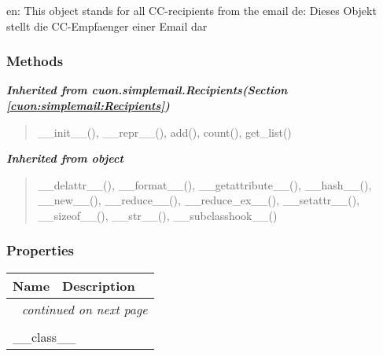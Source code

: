 en: This object stands for all CC-recipients from the email de: Dieses 
Objekt stellt die CC-Empfaenger einer Email dar



  \subsubsection{Methods}


\large{\textbf{\textit{Inherited from cuon.simplemail.Recipients\textit{(Section \ref{cuon:simplemail:Recipients})}}}}

\begin{quote}
\_\_init\_\_(), \_\_repr\_\_(), add(), count(), get\_list()
\end{quote}

\large{\textbf{\textit{Inherited from object}}}

\begin{quote}
\_\_delattr\_\_(), \_\_format\_\_(), \_\_getattribute\_\_(), \_\_hash\_\_(), \_\_new\_\_(), \_\_reduce\_\_(), \_\_reduce\_ex\_\_(), \_\_setattr\_\_(), \_\_sizeof\_\_(), \_\_str\_\_(), \_\_subclasshook\_\_()
\end{quote}


  \subsubsection{Properties}

    \vspace{-1cm}
\hspace{\varindent}\begin{longtable}{|p{\varnamewidth}|p{\vardescrwidth}|l}
\cline{1-2}
\cline{1-2} \centering \textbf{Name} & \centering \textbf{Description}& \\
\cline{1-2}
\endhead\cline{1-2}\multicolumn{3}{r}{\small\textit{continued on next page}}\\\endfoot\cline{1-2}
\endlastfoot\multicolumn{2}{|l|}{\textit{Inherited from object}}\\
\multicolumn{2}{|p{\varwidth}|}{\raggedright \_\_class\_\_}\\
\cline{1-2}
\end{longtable}

